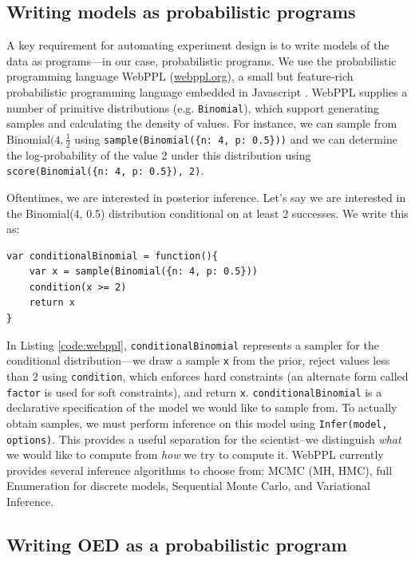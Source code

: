 \documentclass{article}
\begin{document}
\subsection{Writing models as probabilistic programs}

A key requirement for automating experiment design is to write models of the data as programs---in our case, probabilistic programs.
We use the probabilistic programming language WebPPL (\url{webppl.org}), a small but feature-rich probabilistic programming language embedded in Javascript \cite{dippl}.
WebPPL supplies a number of primitive distributions (e.g. \lstinline{Binomial}), which  support generating samples and calculating the density of values.
For instance, we can sample from $\text{Binomial}(4, \frac{1}{2}$ using \lstinline|sample(Binomial({n: 4, p: 0.5}))| and we can determine the log-probability of the value 2 under this distribution using \lstinline|score(Binomial({n: 4, p: 0.5}), 2)|.

Oftentimes, we are interested in posterior inference. Let's say we are interested in the Binomial(4, 0.5) distribution conditional on at least 2 successes. We write this as:
%
\begin{lstlisting}[mathescape, label={code:webppl}, caption = {Posterior inference in WebPPL.}]
var conditionalBinomial = function(){
	var x = sample(Binomial({n: 4, p: 0.5}))
	condition(x >= 2)
	return x
}
\end{lstlisting}

In Listing \ref{code:webppl}, \lstinline{conditionalBinomial} represents a sampler for the conditional distribution---we draw a sample \lstinline{x} from the prior, reject values less than 2 using \lstinline{condition}, which enforces hard constraints (an alternate form called \lstinline{factor} is used for soft constraints), and return \lstinline{x}.
\lstinline{conditionalBinomial} is a declarative specification of the model we would like to sample from.
To actually obtain samples, we must perform inference on this model using \lstinline{Infer(model, options)}.
This provides a useful separation for the scientist--we distinguish \emph{what} we would like to compute from \emph{how} we try to compute it.
WebPPL currently provides several inference algorithms to choose from: MCMC (MH, HMC), full Enumeration for discrete models, Sequential Monte Carlo, and Variational Inference.

\subsection{Writing OED as a probabilistic program}
\end{document}
